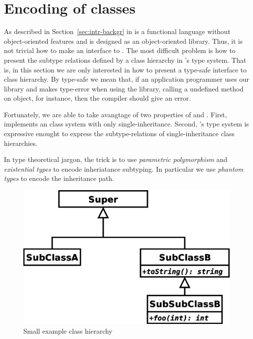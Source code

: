 \documentclass[workingdraft,endnotes]{usetex-v1}
\begin{document}
\section{Encoding of classes}
\label{sec:encoding-classes}

As described in Section~\ref{sec:intr-backgr} \sml in is a functional
language without object-oriented features and \gtk is designed as an
object-oriented library.  Thus, it is not trivial how to make an \sml
interface to \gtk.  The most difficult problem is how to present the
subtype relations defined by a class hierarchy in \sml's type system.
That is, in this section we are only interested in how to present a
type-safe \sml interface to \gtk class hierarchy.  By type-safe we
mean that, if an \sml application programmer uses our library and
makes type-error when using the \gtk library, calling a undefined
method on object, for instance, then the \sml compiler should give an
error.

Fortunately, we are able to take avangtage of two properties of \gtk
and \sml.  First, \gtk implements an class system with only
single-inheritance.  Second, \sml's type system is expressive enought
to express the subtype-relations of single-inheritance class
hierarchies.

In type theoretical jargon, the trick is to use \emph{parametric
  polymorphism} and \emph{existential types} to encode inheriatance
subtyping.  In particular we use \emph{phantom types} to encode the
inheritance path.


\begin{figure}
  \centering
 \includegraphics[width=\linewidth]{example-class-diagram.eps}
  \caption{Small example class hierarchy}
  \label{fig:class-hierarchy}
\end{figure}
\end{document}
